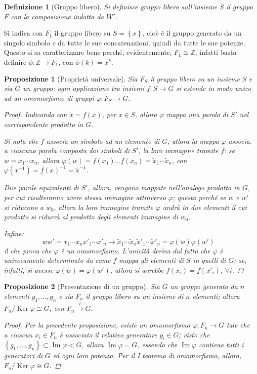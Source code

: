 \documentclass[12pt]{scrartcl}
\theoremstyle{style}
\newtheorem{definizione}{Definizione}[section]
\newtheorem{prop}{Proposizione}[section]
\numberwithin{equation}{subsection}
\begin{document}
\begin{definizione}
	[Gruppo libero]
	Si definisce \textit{gruppo libero sull'insieme} $S$ il gruppo $F$ con la composizione indotta da $W'$.
\end{definizione}
\noindent Si indica con $F_1$ il gruppo libero su $S = \left\{ x \right\} $, cio\`e \`e il gruppo generato da un singolo simbolo e da tutte le sue concatenazioni, quindi da tutte le sue potenze.
Questo si sa caratterizzare bene perch\'e, evidentemente, $F_1 \cong \mathbb{Z}$; infatti basta definire $\phi :\mathbb{Z}\to F_1$, con $\phi (k) = x^k$.

\begin{prop}
	[Propriet\`a universale]
	Sia $F_S$ il gruppo libero su un insieme $S$ e sia $G$ un gruppo; ogni applicazione tra insiemi $f: S \to G$ si estende in modo unico ad un omomorfismo di gruppi $\varphi : F_S \to G$.
	\begin{proof} 
Indicando con $\widetilde{x}=f(x)$, per $x \in S$, allora $\varphi $ mappa una parola di $S'$ nel corrispondente prodotto in $G$.

Si nota che $f$ associa un simbolo ad un elemento di $G$; allora la mappa $\varphi $ associa, a ciascuna parola composta dai simboli di $S'$, la loro immagine tramite $f$: se $w = x_1 \cdots x_n$, allora $\varphi (w) = f(x_1) \ldots f(x_n)=\widetilde{x}_1 \cdots \widetilde{x}_n$, con $\varphi (x^{-1})=f(x)^{-1} = \widetilde{x}^{-1}$.

Due parole equivalenti di $S'$, allora, vengono mappate nell'analogo prodotto in $G$, per cui risulteranno avere stessa immagine attraverso $\varphi $; questo perch\'e se $w$ e $w'$ si riducono a $w_0$, allora la loro immagine tramite $\varphi $ andr\`a in due elementi il cui prodotto si ridurr\`a al prodotto degli elementi immagine di $w_0$.

Infine:
\[
w w'=x_1\cdots x_n x'_1\cdots x'_n\longmapsto \widetilde{x}_1 \cdots \widetilde{x}_n \widetilde{x}'_1 \cdots \widetilde{x}'_n= \varphi (w)\varphi (w')
\] 
il che prova che $\varphi $ \`e un omomorfismo.
L'unicit\`a deriva dal fatto che $\varphi $ \`e univocamente determinato da come $f$ mappa gli elementi di $S$ in quelli di $G$; se, infatti, si avesse $\varphi (w) = \varphi (w')$, allora si avrebbe $f(x_i) = f(x'_i), \ \forall i$.
	\end{proof}
\end{prop}
\begin{prop}
	[Presentazione di un gruppo]
	Sia $G$ un gruppo generato da $n$ elementi $g_1,\ldots,g_n$ e sia $F_n$ il gruppo libero su un insieme di $n$ elementi; allora $F_n / \operatorname{Ker} \varphi  \cong G$, con $F_n \stackrel{\varphi }{\longrightarrow} G$.
	\begin{proof}
		Per la precedente proposizione, esiste un omomorfismo $\varphi : F_n \to G$ tale che a ciascun $x_i \in F_n$ \`e associato il relativo generatore $g_i \in G$; visto che $\left\{ g_1,\ldots,g_n \right\} \subset \operatorname{Im} \varphi < G$, allora $\operatorname{Im} \varphi = G$, essendo che $\operatorname{Im} \varphi $ contiene tutti i generatori di $G$ ed ogni loro potenza.
		Per il I teorema di omomorfismo, allora, $F_n / \operatorname{Ker} \varphi \cong G$.
	\end{proof}
\end{prop}
\end{document}
